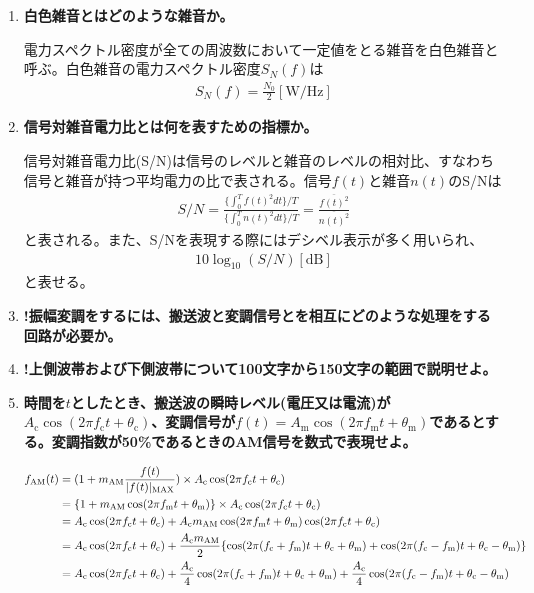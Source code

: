 \documentclass[10pt]{jsarticle}
\begin{document}
\begin{enumerate}
\item\textbf{白色雑音とはどのような雑音か。}

電力スペクトル密度が全ての周波数において一定値をとる雑音を白色雑音と呼ぶ。白色雑音の電力スペクトル密度$S_N(f)$は
\begin{align}
S_N(f)=\frac{N_0}{2}\mathrm{[W/Hz]}
\end{align}

\item\textbf{信号対雑音電力比とは何を表すための指標か。}

信号対雑音電力比(S/N)は信号のレベルと雑音のレベルの相対比、すなわち信号と雑音が持つ平均電力の比で表される。信号$f(t)$と雑音$n(t)$のS/Nは
\begin{align}
S/N=\frac{\{\int^T_0f(t)^2dt\}/T}{\{\int^T_0n(t)^2dt\}/T}=\frac{\overline{f(t)^2}}{\overline{n(t)^2}}
\end{align}
と表される。また、S/Nを表現する際にはデシベル表示が多く用いられ、
\begin{align}
10\log_{10}(S/N)\mathrm{[dB]}
\end{align}
と表せる。

\item\textbf{!振幅変調をするには、搬送波と変調信号とを相互にどのような処理をする回路が必要か。}



\item\textbf{!上側波帯および下側波帯について100文字から150文字の範囲で説明せよ。}



\item\textbf{時間を$t$としたとき、搬送波の瞬時レベル(電圧又は電流)が$A_\mathrm{c}\cos(2\pi f_\mathrm{c} t + \theta_\mathrm{c})$、変調信号が$f(t) = A_\mathrm{m}\cos(2\pi f_\mathrm{m} t + \theta_\mathrm{m})$であるとする。変調指数が50\%であるときのAM信号を数式で表現せよ。}

\begin{align}
f_\mathrm{AM}(t)&=(1+m_\mathrm{AM}\frac{f(t)}{|f(t)|_\mathrm{MAX}})\times A_\mathrm{c}\cos(2\pi f_\mathrm{c} t + \theta_\mathrm{c})\notag\\
&=\{1+m_\mathrm{AM}\cos(2\pi f_\mathrm{m} t + \theta_\mathrm{m})\}\times A_\mathrm{c}\cos(2\pi f_\mathrm{c} t + \theta_\mathrm{c})\notag\\
&=A_\mathrm{c}\cos(2\pi f_\mathrm{c} t + \theta_\mathrm{c}) +A_\mathrm{c} m_\mathrm{AM}\cos(2\pi f_\mathrm{m} t+ \theta_\mathrm{m})\cos(2\pi f_\mathrm{c} t + \theta_\mathrm{c})\notag\\
&=A_\mathrm{c}\cos(2\pi f_\mathrm{c} t + \theta_\mathrm{c}) + \frac{A_\mathrm{c}m_\mathrm{AM}}{2}\{\cos(2 \pi (f_\mathrm{c} + f_\mathrm{m}) t+ \theta_\mathrm{c} + \theta_\mathrm{m}) + \cos(2 \pi (f_\mathrm{c} - f_\mathrm{m}) t+ \theta_\mathrm{c} - \theta_\mathrm{m})\}\notag\\
&=A_\mathrm{c}\cos(2\pi f_\mathrm{c} t + \theta_\mathrm{c}) + \frac{A_\mathrm{c}}{4}\cos(2 \pi (f_\mathrm{c} + f_\mathrm{m}) t+ \theta_\mathrm{c} + \theta_\mathrm{m}) + \frac{A_\mathrm{c}}{4}\cos(2 \pi (f_\mathrm{c} - f_\mathrm{m}) t+ \theta_\mathrm{c} - \theta_\mathrm{m})
\end{align}


\end{enumerate}
\end{document}
